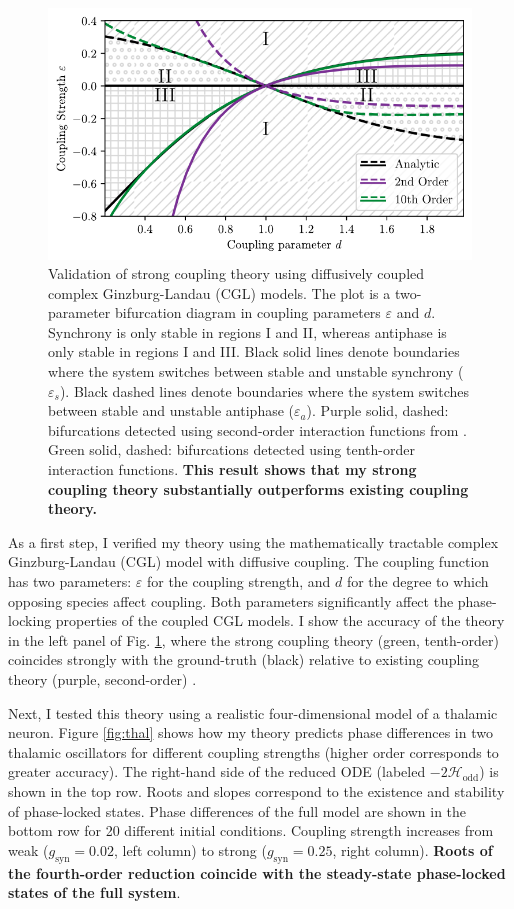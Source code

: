 \documentclass[a4paper,11pt]{article}
\newcommand{\ve}{\varepsilon}
\newcommand{\h}{\mathcal{H}}
\begin{document}
\begin{figure}[ht!]
	\centering
	\includegraphics[width=.75\textwidth]{figures/cgl_2par_edited.pdf}
	\caption{Validation of strong coupling theory using diffusively coupled complex Ginzburg-Landau (CGL) models. The plot is a two-parameter bifurcation diagram in coupling parameters $\ve$ and $d$. Synchrony is only stable in regions I and II, whereas antiphase is only stable in regions I and III. Black solid lines denote boundaries where the system switches between stable and unstable synchrony ($\ve_s$). Black dashed lines denote boundaries where the system switches between stable and unstable antiphase ($\ve_a$). Purple solid, dashed: bifurcations detected using second-order interaction functions from \cite{wilson2019phase}. Green solid, dashed: bifurcations detected using tenth-order interaction functions. \textbf{This result shows that my strong coupling theory substantially outperforms existing coupling theory.}}\label{fig:cgl}
\end{figure}

As a first step, I verified my theory using the mathematically tractable complex Ginzburg-Landau (CGL) model with diffusive coupling. The coupling function has two parameters: $\ve$ for the coupling strength, and $d$ for the degree to which opposing species affect coupling. Both parameters significantly affect the phase-locking properties of the coupled CGL models. I show the accuracy of the theory in the left panel of Fig. \ref{fig:cgl}, where the strong coupling theory (green, tenth-order) coincides strongly with the ground-truth (black) relative to existing coupling theory (purple, second-order) \cite{wilson2019phase}. 

Next, I tested this theory using a realistic four-dimensional model of a thalamic neuron. Figure \ref{fig:thal} shows how my theory predicts phase differences in two thalamic oscillators for different coupling strengths (higher order corresponds to greater accuracy). The right-hand side of the reduced ODE (labeled $-2\h_{\text{odd}}$) is shown in the top row. Roots and slopes correspond to the existence and stability of phase-locked states. Phase differences of the full model are shown in the bottom row for 20 different initial conditions. Coupling strength increases from weak ($g_\text{syn}=0.02$, left column) to strong ($g_\text{syn}=0.25$, right column). \textbf{Roots of the fourth-order reduction coincide with the steady-state phase-locked states of the full system}.
\end{document}

